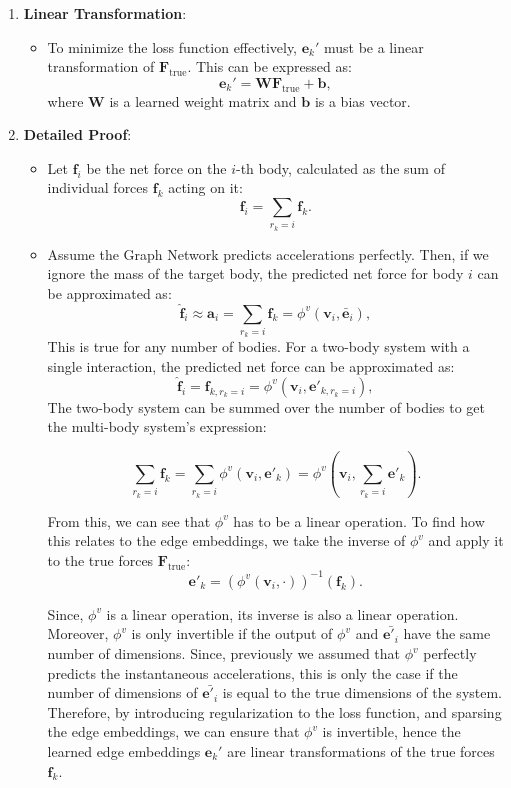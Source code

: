 \documentclass{article}
\begin{document}
\begin{enumerate}
    \item \textbf{Linear Transformation}:
    \begin{itemize}
        \item To minimize the loss function effectively, \( \mathbf{e}_k' \) must be a linear transformation of \( \mathbf{F}_{\text{true}} \). This can be expressed as:
        \[
        \mathbf{e}_k' = \mathbf{W} \mathbf{F}_{\text{true}} + \mathbf{b},
        \]
        where \( \mathbf{W} \) is a learned weight matrix and \( \mathbf{b} \) is a bias vector.
    \end{itemize}

    \item \textbf{Detailed Proof}:
    \begin{itemize}
        \item Let \( \mathbf{f}_i \) be the net force on the \( i \)-th body, calculated as the sum of individual forces \( \mathbf{f}_k \) acting on it:
        \[
        \mathbf{f}_i = \sum_{r_k=i} \mathbf{f}_k.
        \]
        \item Assume the Graph Network predicts accelerations perfectly. Then, if we ignore the mass of the target body, the predicted net force for body \( i \) can be approximated as:
        \[
        \hat{\mathbf{f}}_i \approx \mathbf{a}_i = \sum_{r_k=i} \mathbf{f}_k = \phi^v(\mathbf{v}_i, {\bar{\mathbf{e}}_i}),
        \]
        This is true for any number of bodies. For a two-body system with a single interaction, the predicted net force can be approximated as:
        \[
        \hat{\mathbf{f}}_i = \mathbf{f}_{k,r_{k}=i} = \phi^v(\mathbf{v}_i, \mathbf{e'}_{k,r_{k}=i}),
        \]
        The two-body system can be summed over the number of bodies to get the multi-body system's expression:


        \[
        \sum_{r_k=i} \mathbf{f}_k = \sum_{r_k=i} \phi^v(\mathbf{v}_i, \mathbf{e'}_{k}) = \phi^v(\mathbf{v}_i, \sum_{r_k=i} {\mathbf{e'}_{k}}).
        \]

        From this, we can see that  \( \phi^v \) has to be a linear operation. To find how this relates to the edge embeddings, we take the inverse of \( \phi^v \) and apply it to the true forces \( \mathbf{F}_{\text{true}} \):
        \[
        \mathbf{e'}_{k} = (\phi^v(\mathbf{v}_i, \cdot))^{-1}(\mathbf{f}_k).
        \]

        Since, \( \phi^v \) is a linear operation, its inverse is also a linear operation. Moreover, \( \phi^v \) is only invertible if the output of \( \phi^v \) and \( \bar{\mathbf{e'}_{i}} \) have the same number of dimensions. Since, previously we assumed that \( \phi^v \) perfectly predicts the instantaneous accelerations, this is only the case if the number of dimensions of \( \bar{\mathbf{e'}_{i}} \) is equal to the true dimensions of the system. Therefore, by introducing regularization to the loss function, and sparsing the edge embeddings, we can ensure that \( \phi^v \) is invertible, hence the learned edge embeddings \( \mathbf{e}_k' \) are linear transformations of the true forces \( \mathbf{f}_k \).


\end{itemize}
\end{enumerate}
\end{document}
